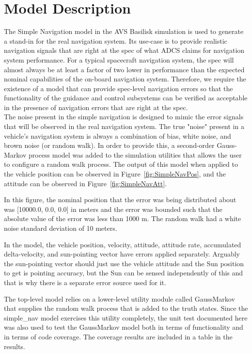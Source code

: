 \section{Model Description}

The Simple Navigation model in the AVS Basilisk simulation is used to generate 
a stand-in for the real navigation system.  Its use-case is to provide realistic 
navigation signals that are right at the spec of what ADCS claims for navigation 
system performance.  For a typical spacecraft navigation system, the spec will 
almost always be at least a factor of two lower in performance than the expected 
nominal capabilities of the on-board navigation system.  Therefore, we require 
the existence of a model that can provide spec-level navigation errors so that 
the functionality of the guidance and control subsystems can be verified as 
acceptable in the presence of navigation errors that are right at the spec. \\

The noise present in the simple navigation is designed to mimic the error signals 
that will be observed in the real navigation system.  The true "noise" present 
in a vehicle's navigation system is always a combination of bias, white noise, 
and brown noise (or random walk).  In order to provide this, a second-order 
Gauss-Markov process model was added to the simulation utilities that allows 
the user to configure a random walk process.  The output of this model when 
applied to the vehicle position can be observed in Figure~\ref{fig:SimpleNavPos}, 
and the attitude can be observed in Figure~\ref{fig:SimpleNavAtt}.




In this figure, the nominal position that the error was being distributed about
 was [10000.0, 0.0, 0.0] in meters and the error was bounded such that the 
absolute value of the error was less than 1000 m.  The random walk had a white 
noise standard deviation of 10 meters.

In the model, the vehicle position, velocity, attitude, attitude rate, 
accumulated delta-velocity, and sun-pointing vector have errors applied 
separately.  Arguably the sun-pointing vector should just use the vehicle 
attitude and the Sun position to get is pointing accuracy, but the Sun can be 
sensed independently of this and that is why there is a separate error source
used for it.

The top-level model relies on a lower-level utility module called GaussMarkov 
that supplies the random walk process that is added to the truth states.  
Since the simple\_nav model exercises this utility completely, the unit test 
documented here was also used to test the GaussMarkov model both in terms of 
functionality and in terms of code coverage.  The coverage results are included 
in a table in the results.